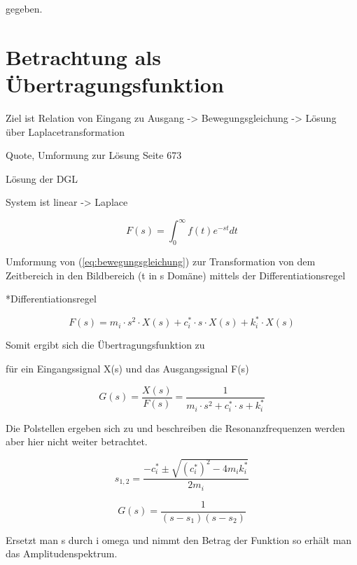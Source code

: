 gegeben.

\pagebreak

\section{Betrachtung als Übertragungsfunktion}
\label{sec:ubertragungsfunktion}

Ziel ist Relation von Eingang zu Ausgang -> Bewegungsgleichung -> Lösung über Laplacetransformation

Quote, Umformung zur Lösung Seite 673

Lösung der DGL

System ist linear -> Laplace 


\begin{equation} \label{laplace}
F(s) = \int_{0}^{\infty} f(t)e^{-st}dt
\end{equation}

Umformung von (\cref{eq:bewegungsgleichung}) zur Transformation von dem Zeitbereich in den Bildbereich (t in s Domäne) mittels der Differentiationsregel

*Differentiationsregel

\begin{equation} \label{laplace1}
F(s) = m_i \cdot s^2 \cdot X(s) + c_i^* \cdot s \cdot X(s) + k_i^* \cdot X(s)
\end{equation}

Somit ergibt sich die Übertragungsfunktion zu

für ein Eingangssignal X(s) und das Ausgangssignal F(s)

\begin{equation} \label{laplace2}
G(s)=\frac{X(s)}{F(s)} = \frac{1}{m_i \cdot s^2 + c_i^* \cdot s + k_i^*}
\end{equation}

Die Polstellen ergeben sich zu und beschreiben die Resonanzfrequenzen werden aber hier nicht weiter betrachtet.

\begin{equation} \label{laplace-pole}
s_{1,2} = \frac{-c_i^* \pm \sqrt{(c_i^*)^2 - 4m_ik_i^*}}{2m_i}
\end{equation}

\begin{equation} \label{laplace3}
G(s)=\frac{1}{(s-s_1)(s-s_2)}
\end{equation}

Ersetzt man s durch i omega und nimmt den Betrag der Funktion so erhält man das Amplitudenspektrum.

